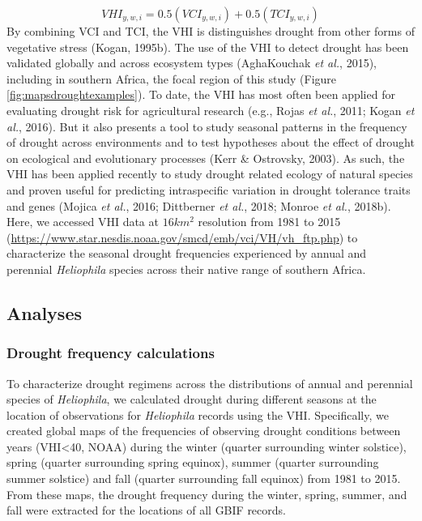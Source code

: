 \documentclass[man,floatsintext]{apa6}
\theoremstyle{definition}
\theoremstyle{definition}
\theoremstyle{definition}
\theoremstyle{remark}
\begin{document}
\[VHI_{y,w,i} = 0.5(VCI_{y,w,i}) + 0.5(TCI_{y,w,i})\] By combining VCI
and TCI, the VHI is distinguishes drought from other forms of vegetative
stress (Kogan, 1995b). The use of the VHI to detect drought has been
validated globally and across ecosystem types (AghaKouchak \emph{et
al.}, 2015), including in southern Africa, the focal region of this
study (Figure \ref{fig:mapsdroughtexamples}). To date, the VHI has most
often been applied for evaluating drought risk for agricultural research
(e.g., Rojas \emph{et al.}, 2011; Kogan \emph{et al.}, 2016). But it
also presents a tool to study seasonal patterns in the frequency of
drought across environments and to test hypotheses about the effect of
drought on ecological and evolutionary processes (Kerr \& Ostrovsky,
2003). As such, the VHI has been applied recently to study drought
related ecology of natural species and proven useful for predicting
intraspecific variation in drought tolerance traits and genes (Mojica
\emph{et al.}, 2016; Dittberner \emph{et al.}, 2018; Monroe \emph{et
al.}, 2018b). Here, we accessed VHI data at \(16km^2\) resolution from
1981 to 2015
(\url{https://www.star.nesdis.noaa.gov/smcd/emb/vci/VH/vh_ftp.php}) to
characterize the seasonal drought frequencies experienced by annual and
perennial \emph{Heliophila} species across their native range of
southern Africa.

\hypertarget{analyses}{%
\subsection{Analyses}\label{analyses}}

\hypertarget{drought-frequency-calculations}{%
\subsubsection{Drought frequency
calculations}\label{drought-frequency-calculations}}

To characterize drought regimens across the distributions of annual and
perennial species of \emph{Heliophila}, we calculated drought during
different seasons at the location of observations for \emph{Heliophila}
records using the VHI. Specifically, we created global maps of the
frequencies of observing drought conditions between years
(VHI\textless{}40, NOAA) during the winter (quarter surrounding winter
solstice), spring (quarter surrounding spring equinox), summer (quarter
surrounding summer solstice) and fall (quarter surrounding fall equinox)
from 1981 to 2015. From these maps, the drought frequency during the
winter, spring, summer, and fall were extracted for the locations of all
GBIF records.
\end{document}

